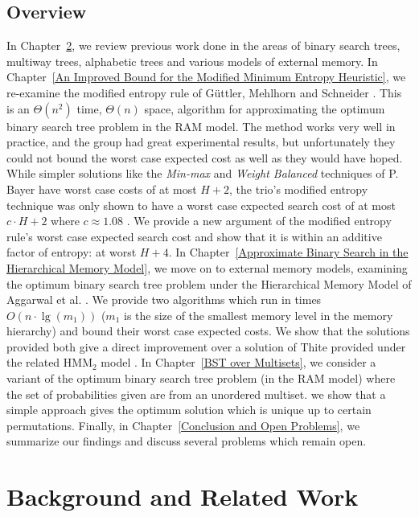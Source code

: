 \documentclass[letterpaper,12pt,titlepage,oneside,final]{book}
\theoremstyle{plain}
\begin{document}
\section{Overview}

In Chapter~\ref{Background and Related Work}, we review previous work done in the areas of binary search trees, multiway trees, alphabetic trees and various models of external memory. In Chapter~\ref{An Improved Bound for the Modified Minimum Entropy Heuristic}, we re-examine the modified entropy rule of G{\"u}ttler, Mehlhorn and Schneider \cite{guttler1980binary}. This is an $\Theta(n^2)$ time, $\Theta(n)$ space, algorithm for approximating the optimum binary search tree problem in the RAM model. The method works very well in practice, and the group had great experimental results, but unfortunately they could not bound the worst case expected cost as well as they would have hoped. While simpler solutions like the \textit{Min-max} and \textit{Weight Balanced} techniques of P. Bayer have worst case costs of at most $H+2$, the trio's modified entropy technique was only shown to have a worst case expected search cost of at most $c\cdot H+2$ where $c \approx 1.08$ \cite{bayer1975improved, guttler1980binary}. We provide a new argument of the modified entropy rule's worst case expected search cost and show that it is within an additive factor of entropy: at worst $H+4$. In Chapter~\ref{Approximate Binary Search in the Hierarchical Memory Model}, we move on to external memory models, examining the optimum binary search tree problem under the Hierarchical Memory Model of Aggarwal et al. \cite{aggarwal1987model}. We provide two algorithms which run in times $O(n\cdot\lg(m_1))$ ($m_1$ is the size of the smallest memory level in the memory hierarchy) and bound their worst case expected costs. We show that the solutions provided both give a direct improvement over a solution of Thite provided under the related HMM$_2$ model \cite{thite2008optimum}. In Chapter~\ref{BST over Multisets}, we consider a variant of the optimum binary search tree problem (in the RAM model) where the set of probabilities given are from an unordered multiset. we show that a simple approach gives the optimum solution which is unique up to certain permutations. Finally, in Chapter~\ref{Conclusion and Open Problems}, we summarize our findings and discuss several problems which remain open.


\chapter{Background and Related Work} \label{Background and Related Work}
\end{document}
